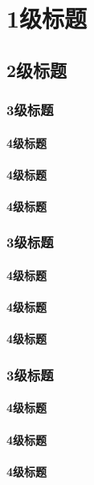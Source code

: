 \chapter{1级标题}
\section{2级标题}
\subsection{3级标题}
\subsubsection{4级标题}
\subsubsection{4级标题}
\subsubsection{4级标题}
\subsection{3级标题}
\subsubsection{4级标题}
\subsubsection{4级标题}
\subsubsection{4级标题}
\subsection{3级标题}
\subsubsection{4级标题}
\subsubsection{4级标题}
\subsubsection{4级标题}

